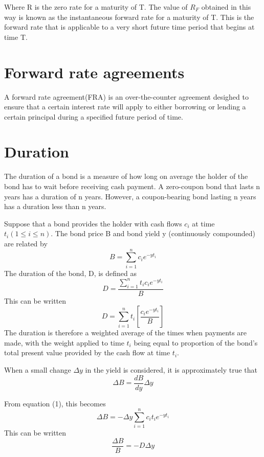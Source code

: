 \documentclass{article}
\begin{document}
Where R is the zero rate for a maturity of T. The value of $ R_F $ obtained in this way is known as the instantaneous forward rate for a maturity of T. This is the forward rate that is applicable to a very short future time period that begins at time T.

\section{Forward rate agreements}
A forward rate agreement(FRA) is an over-the-counter agreement desighed to ensure that a certain interest rate will apply to either borrowing or lending a certain principal during a specified future period of time.

\section{Duration}
The duration of a bond is a measure of how long on average the holder of the bond has to wait before receiving cash payment. A zero-coupon bond that lasts n years has a duration of n years. However, a coupon-bearing bond lasting n years has a duration less than n years.

Suppose that a bond provides the holder with cash flows $ c_i $ at time $ t_i(1\le i\le n) $. The bond price B and bond yield y (continuously compounded) are related by
\begin{equation}
	B=\sum_{i=1}^{n}c_ie^{-yt_i}
\end{equation}
The duration of the bond, D, is defined as
\begin{equation}
	D=\frac{\sum_{i=1}^{n}t_ic_ie^{-yt_i}}{B}
\end{equation}
This can be written 
\begin{equation}
	D=\sum_{i=1}^{n}t_i[\frac{c_ie^{-yt_i}}{B}]
\end{equation}
The duration is therefore a weighted average of the times when payments are made, with the weight applied to time $ t_i $ being equal to proportion of the bond's total present value provided by the cash flow at time $ t_i $.

When a small change $ \Delta y $ in the yield is considered, it is approximately true that 
\begin{equation}
	\Delta B=\frac{dB}{dy}\Delta y
\end{equation}

From equation (1), this becomes
\begin{equation}
	\Delta B=-\Delta y\sum_{i=1}^{n}c_it_ie^{-yt_i}
\end{equation}
This can be written 
\begin{equation}
	\frac{\Delta B}{B}=-D\Delta y
\end{equation}
\end{document}
